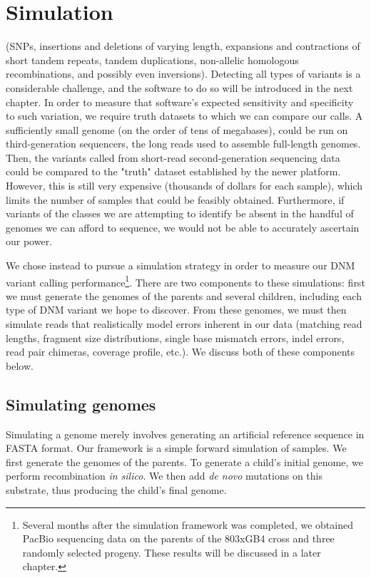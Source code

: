 \chapter{Simulation}
\label{ch:simulation}

 (SNPs, insertions and deletions of varying length, expansions and contractions of short tandem repeats, tandem duplications, non-allelic homologous recombinations, and possibly even inversions).  Detecting all types of variants is a considerable challenge, and the software to do so will be introduced in the next chapter.  In order to measure that software's expected sensitivity and specificity to such variation, we require truth datasets to which we can compare our calls.  A sufficiently small genome (on the order of tens of megabases), could be run on third-generation sequencers, the long reads used to assemble full-length genomes.  Then, the variants called from short-read second-generation sequencing data could be compared to the "truth" dataset established by the newer platform.  However, this is still very expensive (thousands of dollars for each sample), which limits the number of samples that could be feasibly obtained.  Furthermore, if variants of the classes we are attempting to identify be absent in the handful of genomes we can afford to sequence, we would not be able to accurately ascertain our power.

We chose instead to pursue a simulation strategy in order to measure our DNM variant calling performance\footnote{Several months after the simulation framework was completed, we obtained PacBio sequencing data on the parents of the 803xGB4 cross and three randomly selected progeny.  These results will be discussed in a later chapter.}.  There are two components to these simulations: first we must generate the genomes of the parents and several children, including each type of DNM variant we hope to discover.  From these genomes, we must then simulate reads that realistically model errors inherent in our data (matching read lengths, fragment size distributions, single base mismatch errors, indel errors, read pair chimeras, coverage profile, etc.).  We discuss both of these components below.

\section{Simulating genomes}

Simulating a genome merely involves generating an artificial reference sequence in FASTA format.  Our framework is a simple forward simulation of samples.  We first generate the genomes of the parents.  To generate a child's initial genome, we perform recombination \textit{in silico}.  We then add \textit{de novo} mutations on this substrate, thus producing the child's final genome.

